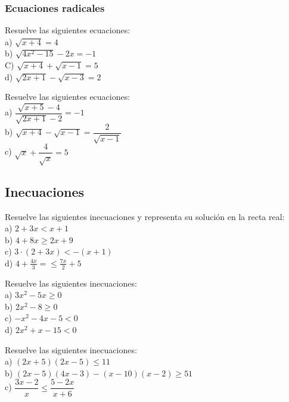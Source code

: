 \subsubsection{Ecuaciones radicales}

\begin{ejer}
Resuelve las siguientes ecuaciones: \\
a) $\sqrt{x+4}=4$ \\
b) $\sqrt{4x^2-15}-2x=-1$ \\
C) $\sqrt{x+4}+\sqrt{x-1}=5$ \\
d) $\sqrt{2x+1}-\sqrt{x-3}=2$
\end{ejer}

\begin{ejer}
Resuelve las siguientes ecuaciones: \\
a) $\dfrac{\sqrt{x+5}-4}{\sqrt{2x+1}-2}=-1$ \\
b) $\sqrt{x+4}-\sqrt{x-1}=\dfrac{2}{\sqrt{x-1}}$ \\
c) $\sqrt{x}+\dfrac{4}{\sqrt{x}}=5$
\end{ejer}

\subsection{Inecuaciones}

\begin{ejer}
Resuelve las siguientes inecuaciones y representa su solución en la recta real: \\
a) $2+3x<x+1$ \\
b) $4+8x\geq 2x+9$ \\
c) $3\cdot (2+3x)<-(x+1)$ \\
d) $4+\frac{4x}{3}=\leq \frac{7x}{2}+5$
\end{ejer}

\begin{ejer}
Resuelve las siguientes inecuaciones: \\
a) $3x^2-5x\geq 0$ \\
b) $2x^2-8\geq 0$ \\
c) $-x^2-4x-5<0$ \\
d) $2x^2+x-15<0$ \\
\end{ejer}

\begin{ejer}
Resuelve las siguientes inecuaciones: \\
a) $(2x+5)(2x-5)\leq 11$ \\
b) $(2x-5)(4x-3)-(x-10)(x-2)\geq 51$ \\
c) $\dfrac{3x-2}{x}\leq \dfrac{5-2x}{x+6}$
\end{ejer}


